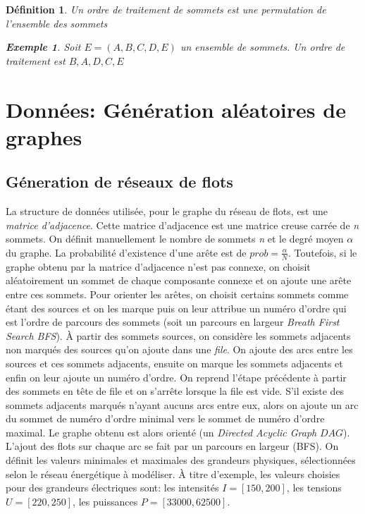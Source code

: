 \documentclass[onecolumn, 12pt]{book}
\newtheorem{definition}{D\'efinition}
\newtheorem{example}{Exemple}
\begin{document}
\begin{definition}
Un ordre de traitement de sommets est une permutation de l'ensemble des sommets
\begin{example}
Soit $E = (A, B, C, D, E)$ un ensemble de sommets. \newline
Un ordre de traitement est $B, A, D, C, E$
\end{example}
\end{definition}

\section{Donn\'ees: G\'en\'eration al\'eatoires de graphes} 
\subsection{G\'eneration de r\'eseaux de flots}
La structure de donn\'ees utilis\'ee, pour le graphe du r\'eseau de flots, est une {\em matrice d'adjacence}.
Cette matrice d'adjacence est une matrice creuse carr\'ee de {\em n} sommets.
On d\'efinit manuellement le nombre de sommets {\em n} et le degr\'e moyen  $\alpha$ du graphe. 
La probabilit\'e d'existence d'une ar\^ete est de $prob = \frac{\alpha}{N}$.
Toutefois, si le graphe obtenu par la matrice d'adjacence n'est pas connexe, on choisit al\'eatoirement un sommet de chaque composante connexe et on ajoute une ar\^ete entre ces sommets.
\newline
Pour orienter les ar\^etes, on choisit certains sommets comme \'etant des sources et on les marque puis on leur attribue un  num\'ero d'ordre qui est l'ordre de parcours des sommets (soit un parcours en largeur {\em Breath First Search BFS}).
\`A partir des sommets sources, on consid\`ere les sommets adjacents non marqu\'es des sources qu'on ajoute dans une {\em file}. On ajoute des arcs entre les sources et ces sommets adjacents, ensuite on marque les sommets adjacents et enfin on leur ajoute un num\'ero d'ordre. On reprend l'\'etape pr\'ec\'edente \`a partir des sommets en t\^ete de file et on s'arr\^ete lorsque la file est vide.
S'il existe des sommets adjacents marqu\'es n'ayant aucuns arcs entre eux, alors on ajoute un arc du sommet de num\'ero d'ordre minimal vers le sommet de num\'ero d'ordre maximal.
Le graphe obtenu est alors orient\'e (un {\em Directed Acyclic Graph} $DAG$).
\newline
L'ajout des flots sur chaque arc se fait par un parcours en largeur (BFS).
On d\'efinit les valeurs minimales et maximales des grandeurs physiques, s\'electionn\'ees selon le r\'eseau \'energ\'etique \`a mod\'eliser. \`A titre d'exemple, les valeurs choisies pour des grandeurs \'electriques sont: les intensit\'es $I = [150, 200 ]$, les tensions $U = [220, 250]$, les puissances $P = [ 33000, 62500]$. \newline
\end{document}

